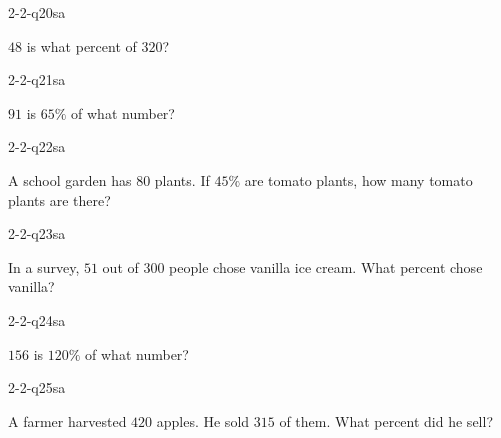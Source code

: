 \begin{practiceQuestion}{2-2-q20}{sa}
\begin{questionText}
$48$ is what percent of $320$?
\end{questionText}
\end{practiceQuestion}

\begin{practiceQuestion}{2-2-q21}{sa}
\begin{questionText}
$91$ is $65\%$ of what number?
\end{questionText}
\end{practiceQuestion}

\begin{practiceQuestion}{2-2-q22}{sa}
\begin{questionText}
A school garden has $80$ plants. If $45\%$ are tomato plants, how many tomato plants are there?
\end{questionText}
\end{practiceQuestion}

\begin{practiceQuestion}{2-2-q23}{sa}
\begin{questionText}
In a survey, $51$ out of $300$ people chose vanilla ice cream. What percent chose vanilla?
\end{questionText}
\end{practiceQuestion}

\begin{practiceQuestion}{2-2-q24}{sa}
\begin{questionText}
$156$ is $120\%$ of what number?
\end{questionText}
\end{practiceQuestion}

\begin{practiceQuestion}{2-2-q25}{sa}
\begin{questionText}
A farmer harvested $420$ apples. He sold $315$ of them. What percent did he sell?
\end{questionText}
\end{practiceQuestion}

